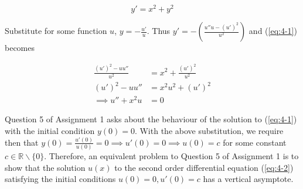 \documentclass{article}
\begin{document}
\begin{equation} \label{eq:4-1}
    y' = x^2 + y^2
\end{equation}

Substitute for some function $u$, $y = -\frac{u'}{u}$. Thus $y' = -\left(\frac{u''u - (u')^2}{u^2}\right)$ and (\ref{eq:4-1}) becomes

\begin{align}
    \frac{(u')^2 - uu''}{u^2} &= x^2 + \frac{(u')^2}{u^2}\nonumber\\
    (u')^2 - uu'' &= x^2u^2 + (u')^2\nonumber\\
    \implies u'' + x^2 u &= 0 \label{eq:4-2}
\end{align}

Question 5 of Assignment 1 asks about the behaviour of the solution to (\ref{eq:4-1}) with the initial condition $y(0) = 0$. With the above
substitution, we require then that $y(0) = \frac{u'(0)}{u(0)} = 0 \implies u'(0) = 0 \implies u(0) = c$ for some constant $c \in \mathbb{R}\backslash\{0\}$. Therefore,
an equivalent problem to Question 5 of Assignment 1 is to show that the solution $u(x)$ to the second order differential equation (\ref{eq:4-2}) satisfying the initial conditions
$u(0) = 0, u'(0) = c$ has a vertical asymptote.
\end{document}
